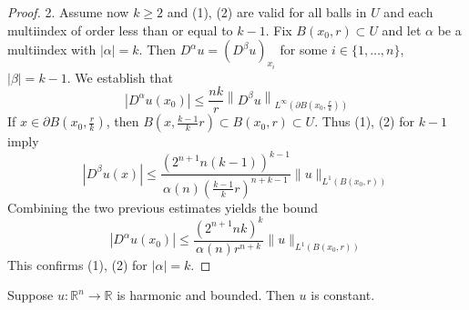 \begin{theorem}
\begin{proof}
        2. Assume now $k \geq 2$ and (1), (2) are valid for all balls in $U$ and each multiindex of order less than or equal to $k-1$.
        Fix $B\left(x_0, r\right) \subset U$ and let $\alpha$
        be a multiindex with $|\alpha|=k$.
        Then $D^\alpha u=\left(D^\beta u\right)_{x_i}$ for some $i \in\{1, \ldots, n\}$, $|\beta|=k-1$.
        We establish that
        \begin{equation*}
            \left|D^\alpha u\left(x_0\right)\right| \leq \frac{n k}{r}\left\|D^\beta u\right\|_{L^{\infty}\left(\partial B\left(x_0, \frac{r}{k}\right)\right)}
        \end{equation*}
        If $x \in \partial B\left(x_0, \frac{r}{k}\right)$, then $B\left(x, \frac{k-1}{k} r\right) \subset B\left(x_0, r\right) \subset U$. Thus (1), (2) for $k-1$ imply
        \begin{equation*}
            \left|D^\beta u(x)\right| \leq \frac{\left(2^{n+1} n(k-1)\right)^{k-1}}{\alpha(n)\left(\frac{k-1}{k} r\right)^{n+k-1}}\|u\|_{L^1\left(B\left(x_0, r\right)\right)}
        \end{equation*}
        Combining the two previous estimates yields the bound
        \begin{equation*}
            \left|D^\alpha u\left(x_0\right)\right| \leq \frac{\left(2^{n+1} n k\right)^k}{\alpha(n) r^{n+k}}\|u\|_{L^1\left(B\left(x_0, r\right)\right)}
        \end{equation*}
        This confirms (1), (2) for $|\alpha|=k$.
    \end{proof}
\end{theorem}

\begin{corollary}
    Suppose $u: \mathbb{R}^n \rightarrow \mathbb{R}$ is harmonic and bounded. Then $u$ is constant.
\end{corollary}

